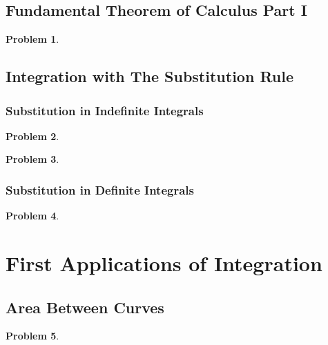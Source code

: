 \documentclass{article}
\newtheorem{problem}{Problem}
\begin{document}
\subsection{Fundamental Theorem of Calculus Part I}\label{secMPSFTCpart1}
\begin{problem}

\end{problem}



\subsection{Integration with The Substitution Rule}
\label{secMPSintegrationSubstitutionRule}
\subsubsection{Substitution in Indefinite Integrals}
\label{secMPSintegrationSubstitutionRuleIndefinite}
\begin{problem}

\end{problem}

\begin{problem}

\end{problem}


\subsubsection{Substitution in Definite Integrals}
\label{secMPSintegrationSubstitutionRuleDefinite}
\begin{problem}

\end{problem}




\section{First Applications of Integration}
\subsection{Area Between Curves}\label{secMPSareaBetweenCurves}
\begin{problem}

\end{problem}

\end{document}

